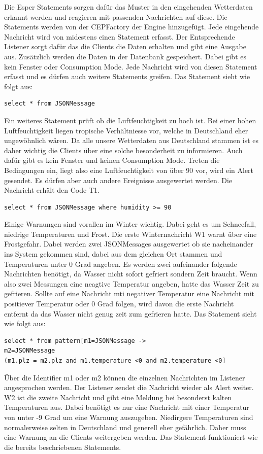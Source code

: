 Die Esper Statements sorgen dafür das Muster in den eingehenden Wetterdaten erkannt werden und reagieren mit passenden Nachrichten auf diese. Die Statements werden von der CEPFactory der Engine hinzugefügt. Jede eingehende Nachricht wird von midestens einen Statement erfasst. Der Entsprechende Listener sorgt dafür das die Clients die Daten erhalten und gibt eine Ausgabe aus. Zusätzlich werden die Daten in der Datenbank gespeichert. Dabei gibt es kein Fenster oder Consumption Mode. Jede Nachricht wird von diesen Statement erfasst und es dürfen auch weitere Statements greifen. Das Statement sieht wie folgt aus: 
\begin{lstlisting}
select * from JSONMessage
\end{lstlisting}
Ein weiteres Statement prüft ob die Luftfeuchtigkeit zu hoch ist. Bei einer hohen Luftfeuchtigkeit liegen tropische Verhältniesse vor, welche in Deutschland eher ungewöhnlich wären. Da alle unsere Wetterdaten aus Deutschland stammen ist es daher wichtig die Clients über eine solche besonderheit zu informieren. Auch dafür gibt es kein Fenster und keinen Consumption Mode. Treten die Bedingungen ein, liegt also eine Luftfeuchtigkeit von über 90 vor, wird ein Alert gesendet. Es dürfen aber auch andere Ereignisse ausgewertet werden.  Die Nachricht erhält den Code T1. 
\begin{lstlisting}
select * from JSONMessage where humidity >= 90
\end{lstlisting}
Einige Warnungen sind vorallen im Winter wichtig. Dabei geht es um Schneefall, niedrige Temperaturen und Frost. Die erste Winternachricht W1 warnt über eine Frostgefahr. Dabei werden zwei JSONMessages ausgewertet ob sie nacheinander ins System gekommen sind, dabei aus dem gleichen Ort stammen und Temperaturen unter 0 Grad angeben. Es werden zwei aufeinander folgende Nachrichten benötigt, da Wasser nicht sofort gefriert sondern Zeit braucht. Wenn also zwei Messungen eine neagtive Temperatur angeben, hatte das Wasser Zeit zu gefrieren. Sollte auf eine Nachricht mti negativer Temperatur eine Nachricht mit positiever Temperatur oder 0 Grad folgen, wird davon die erste Nachricht entfernt da das Wasser nicht genug zeit zum gefrieren hatte. Das Statement sieht wie folgt aus: 
\begin{lstlisting}
select * from pattern[m1=JSONMessage ->
m2=JSONMessage
(m1.plz = m2.plz and m1.temperature <0 and m2.temperature <0]
\end{lstlisting}
Über die Identifier m1 oder m2 können die einzelnen Nachrichten im Listener angesprochen werden. Der Listener sendet die Nachricht wieder als Alert weiter. W2 ist die zweite Nachricht und gibt eine Meldung bei besonderst kalten Temperaturen aus. Dabei benötigt es nur eine Nachricht mit einer Temperatur von unter -9 Grad um eine Warnung auszugeben. Niedirgere Temperaturen sind normalerweise selten in Deutschland und generell eher gefährlich. Daher muss eine Warnung an die Clients weitergeben werden. Das Statement funktioniert wie die bereits beschriebenen Statements. 
